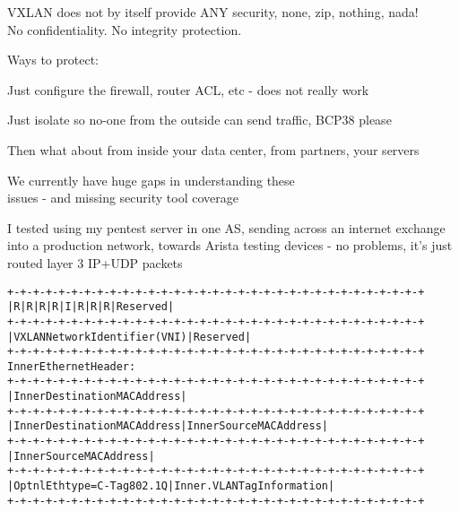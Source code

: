 \documentclass[Screen16to9,17pt]{foils}
\begin{document}

VXLAN does not by itself provide ANY security,
none, zip, nothing, nada! \\
No confidentiality. No integrity protection.

\vskip 5mm

Ways to protect:
\begin{list2}
\item Just configure the firewall, router ACL, etc - does not really work
\item Just isolate so no-one from the outside can send traffic, BCP38 please
\item Then what about from inside your data center, from partners, your servers
\end{list2}

\vskip 1cm
{\Large We currently have huge gaps in understanding these\\
issues - and missing security tool coverage}




I tested using my pentest server in one AS, sending across an internet exchange into a production network, towards Arista testing devices - no problems, it's just routed layer 3 IP+UDP packets


\begin{alltt}\footnotesize
+-+-+-+-+-+-+-+-+-+-+-+-+-+-+-+-+-+-+-+-+-+-+-+-+-+-+-+-+-+-+-+-+
|R|R|R|R|I|R|R|R|            Reserved                           |
+-+-+-+-+-+-+-+-+-+-+-+-+-+-+-+-+-+-+-+-+-+-+-+-+-+-+-+-+-+-+-+-+
|                VXLAN Network Identifier (VNI) |   Reserved    |
+-+-+-+-+-+-+-+-+-+-+-+-+-+-+-+-+-+-+-+-+-+-+-+-+-+-+-+-+-+-+-+-+
Inner Ethernet Header:
+-+-+-+-+-+-+-+-+-+-+-+-+-+-+-+-+-+-+-+-+-+-+-+-+-+-+-+-+-+-+-+-+
|             Inner Destination MAC Address                     |
+-+-+-+-+-+-+-+-+-+-+-+-+-+-+-+-+-+-+-+-+-+-+-+-+-+-+-+-+-+-+-+-+
| Inner Destination MAC Address | Inner Source MAC Address      |
+-+-+-+-+-+-+-+-+-+-+-+-+-+-+-+-+-+-+-+-+-+-+-+-+-+-+-+-+-+-+-+-+
|                Inner Source MAC Address                       |
+-+-+-+-+-+-+-+-+-+-+-+-+-+-+-+-+-+-+-+-+-+-+-+-+-+-+-+-+-+-+-+-+
|OptnlEthtype = C-Tag 802.1Q    | Inner.VLAN Tag Information    |
+-+-+-+-+-+-+-+-+-+-+-+-+-+-+-+-+-+-+-+-+-+-+-+-+-+-+-+-+-+-+-+-+
\end{alltt}
\end{document}

